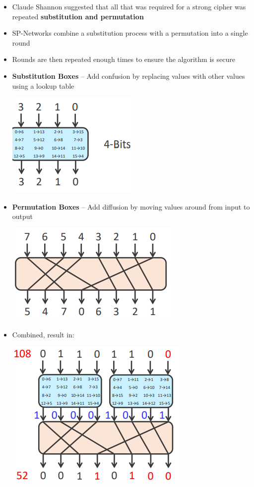 \documentclass{article}
\begin{document}
\begin{itemize}
  \item Claude Shannon suggested that all that was required for a strong cipher was repeated \textbf{substitution and permutation} 
  \item SP-Networks combine a substitution process with a permutation into a single round 
  \item Rounds are then repeated enough times to ensure the algorithm is secure
  \item \textbf{Substitution Boxes} – Add confusion by replacing values with other values using a lookup table
  \begin{center}
    \includegraphics[scale=0.5]{subst_box.png}
  \end{center}
  \item \textbf{Permutation Boxes} – Add diffusion by moving values around from input to output
  \begin{center}
    \includegraphics[scale=0.5]{perm_box.png}
  \end{center}
  \item Combined, result in:
  \begin{center}
    \includegraphics[scale=0.5]{sp_box.png}
  \end{center}
\end{itemize}
\end{document}
